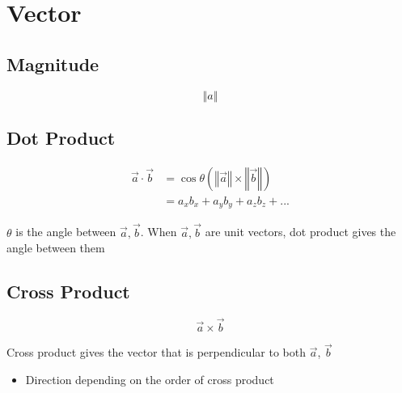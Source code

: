 \chapter{Vector}

\section{Magnitude}

  \begin{equation}
    \left\Vert a \right\Vert
  \end{equation}

\section{Dot Product}

  \begin{align}
    \vec{a} \cdot \vec{b}
    &= \cos \theta
      \left(
        \left\Vert \vec{a} \right\Vert \times \left\Vert \vec{b} \right\Vert
      \right) \\
    &= a_{x} b_{x} + a_{y} b_{y} + a_{z} b_{z} + ...
  \end{align}

  $ \theta $ is the angle between $ \vec{a}, \vec{b} $. When $ \vec{a}, \vec{b} $
  are unit vectors, dot product gives the angle between them

\section{Cross Product}

  \begin{equation}
    \vec{a} \times \vec{b}
  \end{equation}

  Cross product gives the vector that is perpendicular to both $ \vec{a} $,
  $ \vec{b} $

  \begin{itemize}
    \item Direction depending on the order of cross product
  \end{itemize}
